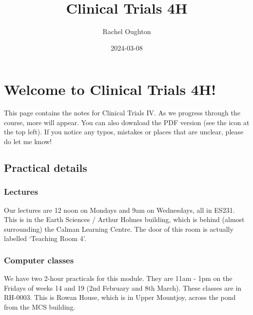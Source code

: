 \documentclass[
  openany]{book}
\title{Clinical Trials 4H}
\author{Rachel Oughton}
\date{2024-03-08}
\theoremstyle{definition}
\theoremstyle{definition}
\theoremstyle{definition}
\theoremstyle{definition}
\theoremstyle{remark}
\begin{document}
\maketitle

{
\setcounter{tocdepth}{1}
\tableofcontents
}
\hypertarget{welcome-to-clinical-trials-4h}{%
\chapter*{Welcome to Clinical Trials 4H!}\label{welcome-to-clinical-trials-4h}}

This page contains the notes for Clinical Trials IV. As we progress through the course, more will appear. You can also download the PDF version (see the icon at the top left). If you notice any typos, mistakes or places that are unclear, please do let me know!

\hypertarget{practical-details}{%
\section*{Practical details}\label{practical-details}}

\hypertarget{lectures}{%
\subsection*{Lectures}\label{lectures}}

Our lectures are 12 noon on Mondays and 9am on Wednesdays, all in ES231. This is in the Earth Sciences / Arthur Holmes building, which is behind (almost surrounding) the Calman Learning Centre. The door of this room is actually labelled `Teaching Room 4'.

\hypertarget{computer-classes}{%
\subsection*{Computer classes}\label{computer-classes}}

We have two 2-hour practicals for this module. They are 11am - 1pm on the Fridays of weeks 14 and 19 (2nd February and 8th March). These classes are in RH-0003. This is Rowan House, which is in Upper Mountjoy, across the pond from the MCS building.
\end{document}
